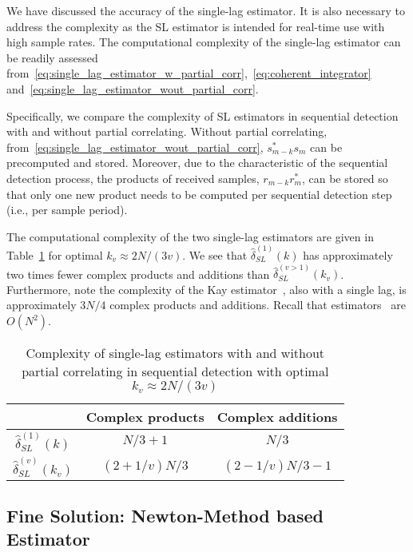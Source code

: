 We have discussed the accuracy of the single-lag estimator.
It is also necessary to address the complexity as the SL estimator
is intended for real-time use with high sample rates.
The computational complexity of the single-lag estimator
can be readily assessed
from~\eqref{eq:single_lag_estimator_w_partial_corr},~\eqref{eq:coherent_integrator}
and~\eqref{eq:single_lag_estimator_wout_partial_corr}.

Specifically, we compare the complexity of SL estimators in sequential detection with and without partial correlating.
Without partial correlating, from~\eqref{eq:single_lag_estimator_wout_partial_corr},
$s_{m-k}^*s_m$ can be precomputed and stored.
Moreover, due to the characteristic of the sequential detection
process,
the products of received samples, $r_{m-k}r_m^*$,
can be stored so that only one new product needs to be computed per
sequential detection step (i.e., per sample period).

The  computational complexity of the two single-lag estimators are given
in Table~\ref{table:computational complexity comparison} for optimal $k_v \approx 2N/(3v)$. 
We see that $\hat{\delta}_{SL}^{(1)}(k)$ has approximately two times
fewer complex products and additions than
$\hat{\delta}_{SL}^{(v>1)}(k_v)$. 
Furthermore, note the complexity of the Kay estimator~\cite{kay_89},
also with a single lag,
is approximately $3N/4$ complex products and additions. 
Recall that estimators~\cite{Fitz_94,Luise_Reggiannini_95} are $O(N^2)$.

\begin{table}[t]
  \caption{Complexity of single-lag estimators with and without partial correlating in sequential detection with optimal $k_v\approx2N/(3v)$}  %
  \centering 
  \begin{tabular}{c c c} 
  \hline\hline 
   & Complex products & Complex additions \\ [0.5ex] 
  \hline 
  $\hat{\delta}_{SL}^{(1)}(k)$  & $N/3+1$ & $N/3$ \\ 
  $\hat{\delta}_{SL}^{(v)}(k_v)$ & $(2+1/v) N/3$ & $(2-1/v)N/3-1$ \\ [1ex]
  \hline
  \end{tabular}
  \label{table:computational complexity comparison}
\end{table}

\subsection{Fine Solution: Newton-Method based Estimator}

